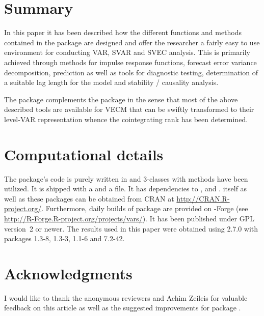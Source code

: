 \documentclass[nojss]{jss}
\begin{document}
\section{Summary}
\label{summary}
In this paper it has been described how the different functions and
methods contained in the package  are designed and offer the
researcher a fairly easy to use environment for conducting VAR, SVAR and SVEC
analysis. This is primarily achieved through methods for impulse
response functions, forecast error variance decomposition, prediction
as well as tools for diagnostic testing, determination of a suitable
lag length for the model and stability / causality analysis.
 
The package  complements the package  in the sense that
most of the above described tools are available for VECM that can be
swiftly transformed to their level-VAR representation whence the
cointegrating rank has been determined.   

\section{Computational details} \label{sec:Appendix}

The package's code is purely written in 
\citep{R2006} and 3-classes with methods have been
utilized. It is shipped with a  and a  file. It has
dependencies to  \citep{MASS}, 
\citep{strucchange} and 
\citep{urca}.  itself as well as these packages can
be obtained from CRAN at \url{http://CRAN.R-project.org/}. Furthermore, daily
builds of package  are provided on -Forge (see
\url{http://R-Forge.R-project.org/projects/vars/}). It has been published under
GPL version~2 or newer. The results used in this paper were obtained using  
2.7.0 with
packages  1.3-8,
 1.3-3,
 1.1-6 and 
7.2-42.  

\section*{Acknowledgments}
I would like to thank the anonymous reviewers and Achim Zeileis for
valuable feedback on this article as well as the suggested
improvements for package .

\clearpage


\end{document}
